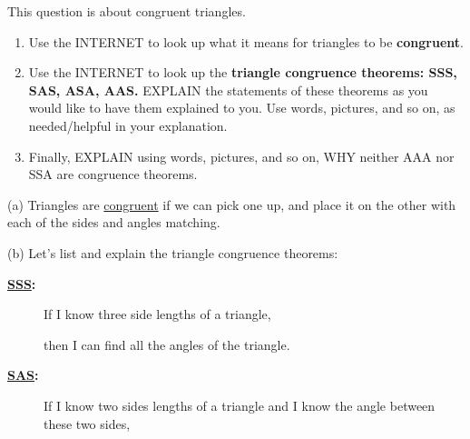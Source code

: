 \documentclass{ximera}
\begin{document}
\begin{question} This question is about congruent triangles.
  \begin{enumerate}
  \item Use the INTERNET to look up what it means for triangles to be
  \textbf{congruent}.
  \item Use the INTERNET to look up the \textbf{triangle congruence
    theorems: SSS, SAS, ASA, AAS.} EXPLAIN the statements of these
    theorems as you would like to have them explained to you. Use
    words, pictures, and so on, as needed/helpful in your explanation.
  \item Finally, EXPLAIN using words, pictures, and so on, WHY neither AAA
  nor SSA are congruence theorems.
  \end{enumerate}

  \begin{freeResponse}
    (a) Triangles are \underline{congruent} if we can pick one up, and
    place it on the other with each of the sides and angles matching.


    
    (b) Let's list and explain the triangle congruence theorems:
    \begin{description}
    \item[\wedn\bfseries\underline{SSS}:] If I know three side lengths
      of a triangle,
      \begin{center}
      \end{center}
      then I can find all the angles of the triangle.
    \item[\wedn\bfseries\underline{SAS}:] If I know two sides lengths
      of a triangle and I know the angle between these two sides,
      \begin{center}
\end{center}
\end{description}
\end{freeResponse}
\end{question}
\end{document}
